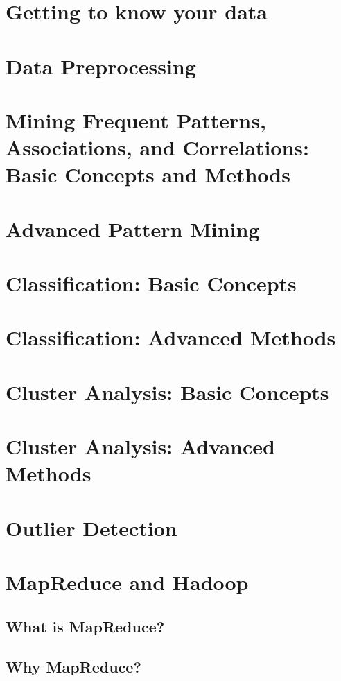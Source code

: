 \documentclass{book}
\begin{document}
    \chapter{Getting to know your data}\label{chap:data}
    \chapter{Data Preprocessing}
    \chapter{Mining Frequent Patterns, Associations, and Correlations: Basic Concepts and Methods}
    \chapter{Advanced Pattern Mining}
    \chapter{Classification: Basic Concepts}
    \chapter{Classification: Advanced Methods}
    \chapter{Cluster Analysis: Basic Concepts}
    \chapter{Cluster Analysis: Advanced Methods}
    \chapter{Outlier Detection}

    \chapter{MapReduce and Hadoop}
    \section{What is MapReduce?}
    \paragraph{}
    
    \section{Why MapReduce?}
\end{document}
